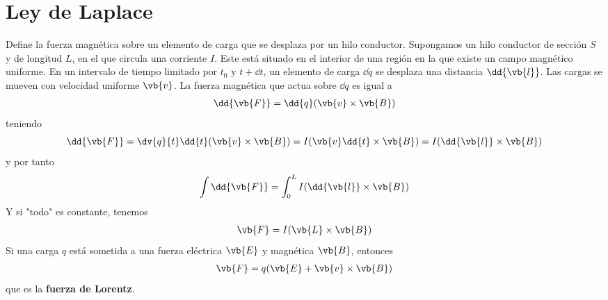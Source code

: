 \documentclass{./FisicaII.tex}
\begin{document}
\section{Ley de Laplace}
Define la fuerza magnética sobre un elemento de carga que se desplaza por un hilo
conductor. Supongamos un hilo conductor de sección \(S\) y de longitud \(L\),
en el que circula una corriente \(I\). Este está situado en el interior de una región
en la que existe un campo magnético uniforme. En un intervalo de tiempo limitado por
\(t_{0}\) y \(t+ \dd{t}\), un elemento de carga \( \dd{q}\) se desplaza una distancia
\( \dd{\vb{l}}\). Las cargas se mueven con velocidad uniforme \(\vb{v}\). La fuerza
magnética que actua sobre \( \dd{q}\) es igual a
\begin{equation}
    \begin{split}
        \dd{\vb{F}} = \dd{q}(\vb{v} \times \vb{B})
    \end{split}
\end{equation}
teniendo
\[
    \dd{\vb{F}} = \dv{q}{t} \dd{t} (\vb{v} \times \vb{B}) =
    I ( \vb{v} \dd{t} \times \vb{B}) = I ( \dd{\vb{l}} \times \vb{B})
\]
y por tanto
\[
    \int \dd{\vb{F}} = \int_{0}^L I ( \dd{\vb{l}} \times \vb{B})
\]
Y si "todo" es constante, tenemos
\begin{equation}
    \begin{split}
        \vb{F} = I(\vb{L} \times \vb{B})
    \end{split}
\end{equation}
Si una carga \(q\) está sometida a una fuerza eléctrica \(\vb{E}\) y magnética \(\vb{B}\),
entonces
\begin{equation}
    \begin{split}
        \vb{F} = q(\vb{E} + \vb{v} \times \vb{B})
    \end{split}
\end{equation}
que es la \textbf{fuerza de Lorentz}.
\end{document}
